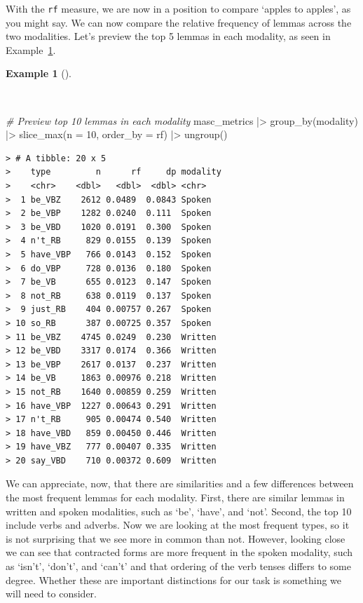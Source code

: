 \documentclass[
  letterpaper,
  DIV=11,
  numbers=noendperiod]{scrreprt}
\newenvironment{Shaded}{\begin{snugshade}}{\end{snugshade}}
\newcommand{\AttributeTok}[1]{\textcolor[rgb]{0.00,0.00,0.00}{#1}}
\newcommand{\CommentTok}[1]{\textcolor[rgb]{0.00,0.00,0.00}{\textit{#1}}}
\newcommand{\DecValTok}[1]{\textcolor[rgb]{0.00,0.00,0.00}{#1}}
\newcommand{\FunctionTok}[1]{\textcolor[rgb]{0.00,0.00,0.00}{#1}}
\newcommand{\NormalTok}[1]{\textcolor[rgb]{0.00,0.00,0.00}{#1}}
\newcommand{\SpecialCharTok}[1]{\textcolor[rgb]{0.00,0.00,0.00}{#1}}
\theoremstyle{definition}
\newtheorem{example}{Example}[chapter]
\theoremstyle{remark}
\begin{document}
With the \texttt{rf} measure, we are now in a position to compare
`apples to apples', as you might say. We can now compare the relative
frequency of lemmas across the two modalities. Let's preview the top 5
lemmas in each modality, as seen in
Example~\ref{exm-eda-masc-relative-frequency-top}.

\begin{example}[]\protect\hypertarget{exm-eda-masc-relative-frequency-top}{}\label{exm-eda-masc-relative-frequency-top}

~

\begin{Shaded}
\begin{Highlighting}[]
\CommentTok{\# Preview top 10 lemmas in each modality}
\NormalTok{masc\_metrics }\SpecialCharTok{|\textgreater{}}
  \FunctionTok{group\_by}\NormalTok{(modality) }\SpecialCharTok{|\textgreater{}}
  \FunctionTok{slice\_max}\NormalTok{(}\AttributeTok{n =} \DecValTok{10}\NormalTok{, }\AttributeTok{order\_by =}\NormalTok{ rf) }\SpecialCharTok{|\textgreater{}}
  \FunctionTok{ungroup}\NormalTok{()}
\end{Highlighting}
\end{Shaded}

\begin{verbatim}
> # A tibble: 20 x 5
>    type         n      rf     dp modality
>    <chr>    <dbl>   <dbl>  <dbl> <chr>   
>  1 be_VBZ    2612 0.0489  0.0843 Spoken  
>  2 be_VBP    1282 0.0240  0.111  Spoken  
>  3 be_VBD    1020 0.0191  0.300  Spoken  
>  4 n't_RB     829 0.0155  0.139  Spoken  
>  5 have_VBP   766 0.0143  0.152  Spoken  
>  6 do_VBP     728 0.0136  0.180  Spoken  
>  7 be_VB      655 0.0123  0.147  Spoken  
>  8 not_RB     638 0.0119  0.137  Spoken  
>  9 just_RB    404 0.00757 0.267  Spoken  
> 10 so_RB      387 0.00725 0.357  Spoken  
> 11 be_VBZ    4745 0.0249  0.230  Written 
> 12 be_VBD    3317 0.0174  0.366  Written 
> 13 be_VBP    2617 0.0137  0.237  Written 
> 14 be_VB     1863 0.00976 0.218  Written 
> 15 not_RB    1640 0.00859 0.259  Written 
> 16 have_VBP  1227 0.00643 0.291  Written 
> 17 n't_RB     905 0.00474 0.540  Written 
> 18 have_VBD   859 0.00450 0.446  Written 
> 19 have_VBZ   777 0.00407 0.335  Written 
> 20 say_VBD    710 0.00372 0.609  Written
\end{verbatim}

\end{example}

We can appreciate, now, that there are similarities and a few
differences between the most frequent lemmas for each modality. First,
there are similar lemmas in written and spoken modalities, such as `be',
`have', and `not'. Second, the top 10 include verbs and adverbs. Now we
are looking at the most frequent types, so it is not surprising that we
see more in common than not. However, looking close we can see that
contracted forms are more frequent in the spoken modality, such as
`isn't', `don't', and `can't' and that ordering of the verb tenses
differs to some degree. Whether these are important distinctions for our
task is something we will need to consider.
\end{document}
